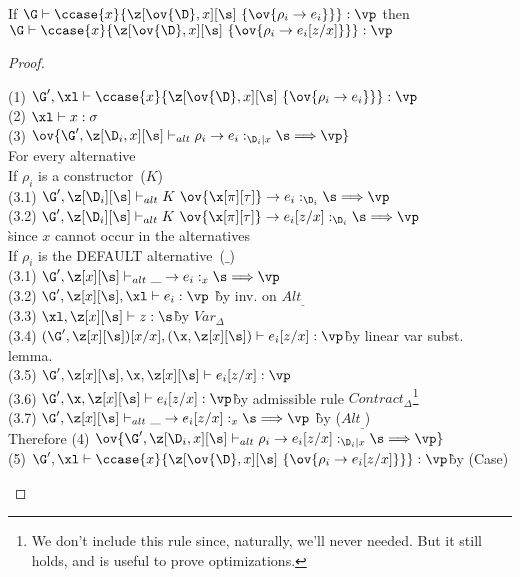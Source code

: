 \begin{lemma}
    If $\G \vdash \ccase{x}{\z[\ov{\D},x][\s]~\{\ov{\rho_i\to e_i}\}} : \vp$ then $\G \vdash \ccase{x}{\z[\ov{\D},x][\s]~\{\ov{\rho_i\to e_i[z/x]}\}} : \vp$
\end{lemma}

%
%
%
%

\begin{proof}~

\begin{tabbing}
    (1) $\G', \xl \vdash \ccase{x}{\z[\ov{\D},x][\s]~\{\ov{\rho_i\to e_i}\}} : \vp$\\
    (2) $\xl \vdash x : \sigma$\\
    (3) $\ov{\G',\z[\D_i,x][\s] \vdash_{alt} \rho_i \rightarrow e_i :_{\D_i | x} \s \Longrightarrow \vp}$\\
    For every alternative\\
    If $\rho_i$ is a constructor~($K$)\\
    (3.1) $\G',\z[\D_i][\s] \vdash_{alt} K~\ov{\x[\pi][\tau]} \rightarrow e_i :_{\D_i} \s \Longrightarrow \vp$\\
    (3.2) $\G',\z[\D_i][\s] \vdash_{alt} K~\ov{\x[\pi][\tau]} \rightarrow e_i[z/x] :_{\D_i} \s \Longrightarrow \vp$\\
    \` since $x$ cannot occur in the alternatives\\
    If $\rho_i$ is the DEFAULT alternative~($\_$)\\
    (3.1) $\G',\z[x][\s] \vdash_{alt} \_ \to e_i :_{x} \s \Longrightarrow \vp$\\
    (3.2) $\G',\z[x][\s],\xl \vdash e_i : \vp$ \` by inv. on $Alt_{\_}$\\
    (3.3) $\xl,\z[x][\s] \vdash z : \s$\` by $Var_\Delta$\\
    (3.4) $(\G',\z[x][\s])[x / x], (\x,\z[x][\s]) \vdash e_i[z/x] : \vp$\`by linear var subst. lemma.\\
    (3.5) $\G',\z[x][\s], \x, \z[x][\s] \vdash e_i[z/x] : \vp$\\
    (3.6) $\G', \x, \z[x][\s] \vdash e_i[z/x] : \vp$\` by admissible rule $Contract_\Delta$\footnote{We don't include this rule since, naturally, we'll never needed. But it still holds, and is useful to prove optimizations.} \\
    (3.7) $\G',\z[x][\s] \vdash_{alt} \_ \to e_i[z/x] :_{x} \s \Longrightarrow \vp$ \` by ($Alt_\_$)\\
    Therefore
    (4) $\ov{\G',\z[\D_i,x][\s] \vdash_{alt} \rho_i \rightarrow e_i[z/x] :_{\D_i | x} \s \Longrightarrow \vp}$\\
    (5) $\G', \xl \vdash \ccase{x}{\z[\ov{\D},x][\s]~\{\ov{\rho_i\to e_i[z/x]}\}} : \vp$\` by (Case)\\

\end{tabbing}
\end{proof}


